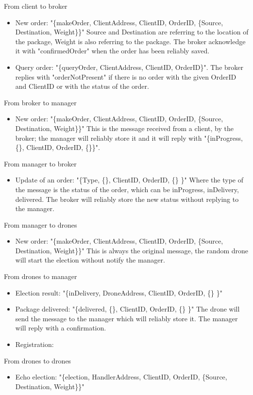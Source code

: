 \documentclass[a4paper, oneside]{memoir}
\begin{document}
From client to broker
\begin{itemize}
	\item New order: "\{makeOrder, ClientAddress, ClientID, OrderID, \{Source, Destination, Weight\}\}"
	Source and Destination are referring to the location of the package, Weight is also referring to the package. The broker acknowledge it with "confirmedOrder" when the order has been reliably saved.

	\item Query order: "\{queryOrder, ClientAddress, ClientID, OrderID\}". The broker replies with "orderNotPresent" if there is no order with the given OrderID and ClientID or with the status of the order.
\end{itemize} \vspace{1em}
From broker to manager
\begin{itemize}
	\item New order: "\{makeOrder, ClientAddress, ClientID, OrderID, \{Source, Destination, Weight\}\}"
	This is the message received from a client, by the broker; the manager will reliably store it and it will reply with "\{inProgress, \{\}, ClientID, OrderID, \{\}\}".
\end{itemize} \vspace{1em}
From manager to broker
\begin{itemize}
	\item Update of an order: "\{Type, \{\}, ClientID, OrderID, \{\} \}"
	Where the type of the message is the status of the order, which can be inProgress, inDelivery, delivered. The broker will reliably store the new status without replying to the manager.
\end{itemize}\vspace{1em}
From manager to drones
\begin{itemize}
	\item New order: "\{makeOrder, ClientAddress, ClientID, OrderID, \{Source, Destination, Weight\}\}"
	This is always the original message, the random drone will start the election without notify the manager.
\end{itemize} \vspace{1em}
From drones to manager
\begin{itemize}
	\item Election result: "\{inDelivery, DroneAddress, ClientID, OrderID, \{\} \}"

	\item Package delivered: "\{delivered, \{\}, ClientID, OrderID, \{\} \}"
	The drone will send the message to the manager which will reliably store it. The manager will reply with a confirmation.

	\item Registration:
\end{itemize} \vspace{1em}
From drones to drones
\begin{itemize}
	\item Echo election: "\{election, HandlerAddress, ClientID, OrderID, \{Source, Destination, Weight\}\}"
\end{itemize}
\newpage
\end{document}
